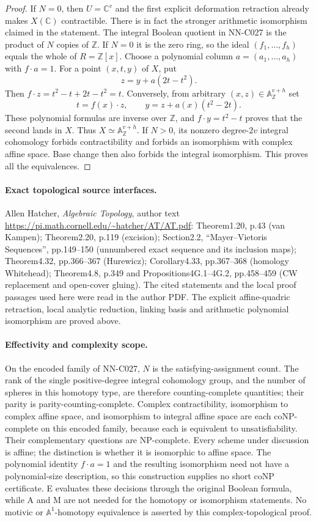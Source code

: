 \begin{proof}
If $N=0$, then $U=\mathbb C^v$ and the first explicit deformation
retraction already makes $X(\mathbb C)$ contractible. There is in
fact the stronger arithmetic isomorphism claimed in the statement.
The integral Boolean quotient in NN-C027 is the product of $N$
copies of $\mathbb Z$. If $N=0$ it is the zero ring, so the ideal
$(f_1,\ldots,f_h)$ equals the whole of $R=\mathbb Z[x]$.
Choose a polynomial column $a=(a_1,\ldots,a_h)$ with $f\cdot a=1$.
For a point $(x,t,y)$ of $X$, put
\[
                         z=y+a(2t-t^2).
\]
Then $f\cdot z=t^2-t+2t-t^2=t$. Conversely, from arbitrary
$(x,z)\in\mathbb A^{v+h}_{\mathbb Z}$ set
\[
             t=f(x)\cdot z,\qquad y=z+a(x)(t^2-2t).
\]
These polynomial formulas are inverse over $\mathbb Z$, and
$f\cdot y=t^2-t$ proves that the second lands in $X$.
Thus $X\simeq\mathbb A^{v+h}_{\mathbb Z}$.
If $N>0$, its nonzero degree-$2v$ integral cohomology forbids
contractibility and forbids an isomorphism with complex affine
space. Base change then also forbids the integral isomorphism.
This proves all the equivalences.
\end{proof}

\paragraph{Exact topological source interfaces.}
Allen Hatcher, \emph{Algebraic Topology}, author text
\url{https://pi.math.cornell.edu/~hatcher/AT/AT.pdf}:
Theorem1.20, p.43 (van Kampen);
Theorem2.20, p.119 (excision);
Section2.2, ``Mayer--Vietoris Sequences'', pp.149--150 (unnumbered
exact sequence and its inclusion maps);
Theorem4.32, pp.366--367 (Hurewicz);
Corollary4.33, pp.367--368 (homology Whitehead);
Theorem4.8, p.349 and Propositions4G.1--4G.2, pp.458--459
(CW replacement and open-cover gluing).
The cited statements and the local proof passages used here were
read in the author PDF. The explicit affine-quadric retraction,
local analytic reduction, linking basis and arithmetic polynomial
isomorphism are proved above.

\paragraph{Effectivity and complexity scope.}
On the encoded family of NN-C027, $N$ is the satisfying-assignment
count. The rank of the single positive-degree integral cohomology
group, and the number of spheres in this homotopy type, are therefore
counting-complete quantities; their parity is parity-counting-complete.
Complex contractibility, isomorphism to complex affine space, and
isomorphism to integral affine space are each coNP-complete on this
encoded family, because each is equivalent to unsatisfiability.
Their complementary questions are NP-complete. Every scheme under
discussion is affine; the distinction is whether it is isomorphic
to affine space. The polynomial identity $f\cdot a=1$ and the
resulting isomorphism need not have a polynomial-size description,
so this construction supplies no short coNP certificate. E evaluates
these decisions through the original Boolean formula, while A and M
are not needed for the homotopy or isomorphism statements.
No motivic or $\mathbb A^1$-homotopy equivalence is asserted by this
complex-topological proof.
